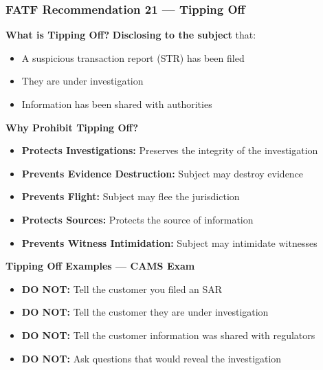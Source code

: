 \documentclass[12pt,aspectratio=169]{beamer}
\renewcommand{\scriptsize}{\fontsize{4.5}{5.5}\selectfont}
\begin{document}
	\begin{frame}
		\frametitle{\fontsize{11}{13}\selectfont \textbf{FATF Recommendation 21 — Tipping Off}}
		\begin{block}{\fontsize{7}{9}\selectfont \textbf{What is Tipping Off?}}
			\scriptsize
			\textbf{Disclosing to the subject} that:
			\begin{itemize}
				\item A suspicious transaction report (STR) has been filed
				\item They are under investigation
				\item Information has been shared with authorities
			\end{itemize}
		\end{block}
		\vspace{0.02cm}
		\begin{block}{\fontsize{7}{9}\selectfont \textbf{Why Prohibit Tipping Off?}}
			\scriptsize
			\begin{itemize}
				\item \textbf{Protects Investigations:} Preserves the integrity of the investigation
				\item \textbf{Prevents Evidence Destruction:} Subject may destroy evidence
				\item \textbf{Prevents Flight:} Subject may flee the jurisdiction
				\item \textbf{Protects Sources:} Protects the source of information
				\item \textbf{Prevents Witness Intimidation:} Subject may intimidate witnesses
			\end{itemize}
		\end{block}
		\vspace{0.02cm}
		\begin{block}{\fontsize{7}{9}\selectfont \textbf{Tipping Off Examples — CAMS Exam}}
			\scriptsize
			\begin{itemize}
				\item \textbf{DO NOT:} Tell the customer you filed an SAR
				\item \textbf{DO NOT:} Tell the customer they are under investigation
				\item \textbf{DO NOT:} Tell the customer information was shared with regulators
				\item \textbf{DO NOT:} Ask questions that would reveal the investigation

\end{itemize}
\end{block}
\end{frame}
\end{document}
